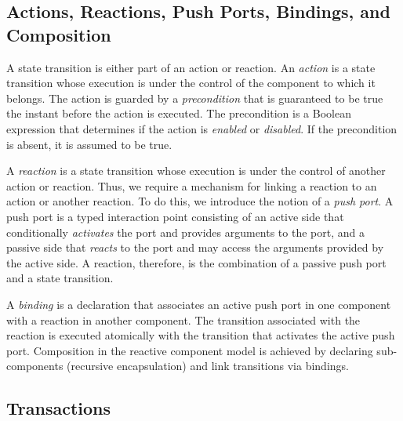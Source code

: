 \subsection{Actions, Reactions, Push Ports, Bindings, and Composition}
\label{composition}
A state transition is either part of an action or reaction.
An \emph{action} is a state transition whose execution is under the control of the component to which it belongs.
The action is guarded by a \emph{precondition} that is guaranteed to be true the instant before the action is executed.
The precondition is a Boolean expression that determines if the action is \emph{enabled} or \emph{disabled}.
If the precondition is absent, it is assumed to be true.

A \emph{reaction} is a state transition whose execution is under the control of another action or reaction.
Thus, we require a mechanism for linking a reaction to an action or another reaction.
To do this, we introduce the notion of a \emph{push port}.
A push port is a typed interaction point consisting of an active side that conditionally \emph{activates} the port and provides arguments to the port, and a passive side that \emph{reacts} to the port and may access the arguments provided by the active side.
A reaction, therefore, is the combination of a passive push port and a state transition.

A \emph{binding} is a declaration that associates an active push port in one component with a reaction in another component.
The transition associated with the reaction is executed atomically with the transition that activates the active push port.
Composition in the reactive component model is achieved by declaring sub-components (recursive encapsulation) and link transitions via bindings.

\subsection{Transactions}

